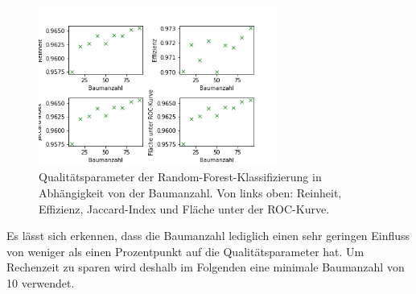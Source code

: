   \begin{figure}
    \centering
    \includegraphics[width=0.7\textwidth]{plots/RF_baumtiefe.png}
    \caption{Qualitätsparameter der Random-Forest-Klassifizierung in Abhängigkeit von der Baumanzahl. Von links oben: Reinheit, Effizienz, Jaccard-Index und Fläche unter der ROC-Kurve.}
    \label{fig:RF_Tiefe}
  \end{figure}
  \FloatBarrier
  Es lässt sich erkennen, dass die Baumanzahl lediglich einen sehr geringen Einfluss von weniger als einen Prozentpunkt auf die Qualitätsparameter hat. Um Rechenzeit zu sparen wird deshalb im Folgenden eine minimale Baumanzahl von 10 verwendet.

